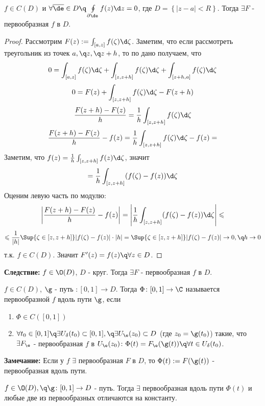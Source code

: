 \begin{theorem}
  $f\in C(D)$ и $\forall \overline{\de}\in D\q \oint\limits_{\partial\de}f(z)\d z=0$, где $D=\left\{|z-a|<R\right\}$. Тогда $\exists F$ - первообразная $f$ в $D$. 
\end{theorem}
\begin{proof}
  Рассмотрим $F(z):=\int_{[a,z]}f(\zeta)\d \zeta$. Заметим, что если рассмотреть треугольник из точек $a,\q z,\q z+h$, то по дано получаем, что 
  \[0 = \int_{[a,z]}f(\zeta)\d \zeta + \int_{[z,z+h]}f(\zeta)\d \zeta + \int_{[z+h,a]}f(\zeta)\d \zeta\]
  \[0 = F(z) + \int_{[z,z+h]}f(\zeta)\d \zeta - F(z+h)\]
  \[\frac{F(z+h) - F(z)}{h} = \frac{1}{h}\int_{[z,z+h]}f(\zeta)\d \zeta\]
  \[\frac{F(z+h) - F(z)}{h} - f(z)= \frac{1}{h}\int_{[z,z+h]}f(\zeta)\d \zeta - f(z)=\]
  Заметим, что $f(z) = \frac{1}{h}\int_{[z,z+h]}f(z)\d \zeta$, значит
  \[=\frac{1}{h}\int_{[z,z+h]}(f(\zeta)-f(z))\d \zeta\]
  Оценим левую часть по модулю:
  \[\left|\frac{F(z+h) - F(z)}{h} - f(z)\right| = \left|\frac{1}{h}\int_{[z,z+h]}(f(\zeta)-f(z))\d \zeta\right|\leqslant\]\[\leqslant \frac{1}{|h|}\Sup{\zeta\in[z,z+h]}|f(\zeta)-f(z)|\cdot |h| = \Sup{\zeta\in[z,z+h]}|f(\zeta)-f(z)|\to 0,\q h\to 0\]
  т.к. $f\in C(D)$. Значит $F'(z)=f(z)\q\forall z\in D$.
\end{proof}
\textbf{Следствие:} $f\in\O(D)$, $D$ - круг. Тогда $\exists F$ - первообразная $f$ в $D$. 
\begin{definition}
  $f\in C(D)$, $\g$ - путь $\colon [0,1]\to D$. Тогда $\Phi\colon [0,1]\to\C$ называется первообразной $f$ вдоль пути $\g$, если
  \begin{enumerate}
    \item $\Phi\in C([0,1])$
    \item $\forall t_0\in[0,1]\q\exists U_\delta(t_0)\subset [0,1],\q\exists U_\e(z_0)\subset D$  (где $z_0=\g(t_0)$) такие, что $\exists F_\e$ - первообразная $f$ в $U_\e(z_0)\colon \Phi(t) = F_\e(\g(t))\q\forall t\in U_\delta(t_0)$. 
  \end{enumerate}
\end{definition}
\textbf{Замечание:} Если у $f$ $\exists$ первообразная $F$ в $D$, то $\Phi(t):=F(\g(t))$ - первообразная вдоль пути. 
\begin{theorem}
  $f\in\O(D),\q \g\colon[0,1]\to D$ - путь. Тогда $\exists$ первообразная вдоль пути $\Phi(t)$ и любые две из первообразных отличаются на константу. 
\end{theorem}
